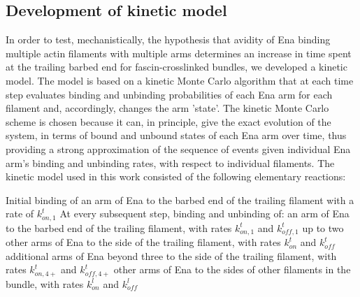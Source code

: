 \subsection{Development of kinetic model}\label{ena-si-develop-model}
In order to test, mechanistically, the hypothesis that avidity of Ena binding multiple actin filaments with multiple arms determines an increase in time spent at the trailing barbed end for fascin-crosslinked bundles, we developed a kinetic model. The model is based on a kinetic Monte Carlo algorithm that at each time step evaluates binding and unbinding probabilities of each Ena arm for each filament and, accordingly, changes the arm 'state'. The kinetic Monte Carlo scheme is chosen because it can, in principle, give the exact evolution of the system, in terms of bound and unbound states of each Ena arm over time, thus providing a strong approximation of the sequence of events given individual Ena arm's binding and unbinding rates, with respect to individual filaments. The kinetic model used in this work consisted of the following elementary reactions:
\begin{outline}[enumerate]
   \1 Initial binding of an arm of Ena to the barbed end of the trailing filament with a rate of $k_{on,1}^{t}$
   \1 At every subsequent step, binding and unbinding of:
      \2 an arm of Ena to the barbed end of the trailing filament, with rates $k_{on,1}^{t}$ and $k_{off,1}^{t}$
      \2 up to two other arms of Ena to the side of the trailing filament, with rates $k_{on}^{t}$ and $k_{off}^{t}$
      \2 additional arms of Ena beyond three to the side of the trailing filament, with rates $k_{on,4+}^{t}$ and $k_{off,4+}^{t}$
      \2 other arms of Ena to the sides of other filaments in the bundle, with rates $k_{on}^{l}$ and $k_{off}^{l}$
\end{outline}

